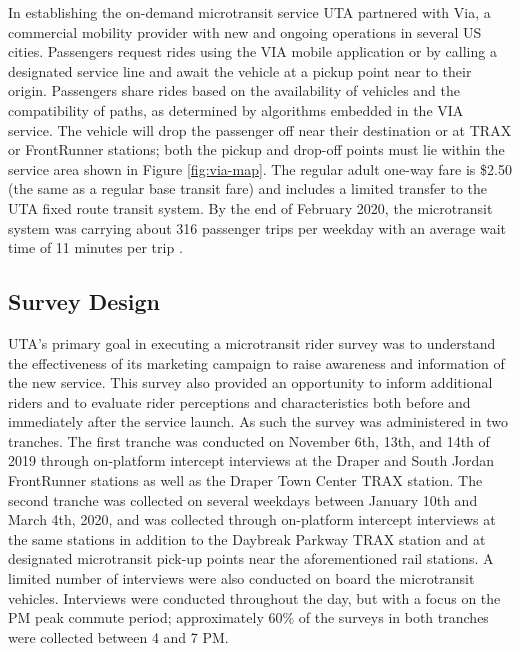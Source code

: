 \documentclass[smartcities,article,submit,moreauthors,pdftex]{mdpi}
\begin{document}
In establishing the on-demand microtransit service UTA partnered with Via, a
commercial mobility provider with new and ongoing operations in several US
cities. Passengers request rides using the VIA mobile application or by calling a
designated service line and await the vehicle at a pickup point near to their
origin. Passengers share rides based on the availability of vehicles and the
compatibility of paths, as determined by algorithms embedded in the VIA service.
The vehicle will drop the passenger off near their destination or at TRAX or
FrontRunner stations; both the pickup and drop-off points must lie within the
service area shown in Figure \ref{fig:via-map}. The regular adult one-way fare
is \$2.50 (the same as a regular base transit fare) and includes a limited
transfer to the UTA fixed route transit system. By the end of February 2020, the
microtransit system was carrying about 316 passenger trips per weekday with an
average wait time of 11 minutes per trip \citep{uta2020}.

\hypertarget{survey-design}{%
\subsection{Survey Design}\label{survey-design}}

UTA's primary goal in executing a microtransit rider survey was to understand the effectiveness
of its marketing campaign to raise awareness and information of the new service.
This survey also provided an opportunity to inform additional riders and to
evaluate rider perceptions and characteristics both before and immediately after
the service launch. As such the survey was administered in two tranches. The
first tranche was conducted on November 6th, 13th, and 14th of 2019 through
on-platform intercept interviews at the Draper and South Jordan FrontRunner
stations as well as the Draper Town Center TRAX station. The second tranche was
collected on several weekdays between January 10th and March 4th, 2020, and was
collected through on-platform intercept interviews at the same stations in
addition to the Daybreak Parkway TRAX station and at designated microtransit
pick-up points near the aforementioned rail stations. A limited number of
interviews were also conducted on board the microtransit vehicles. Interviews
were conducted throughout the day, but with a focus on the PM peak commute
period; approximately 60\% of the surveys in both tranches were collected between 4 and 7 PM.
\end{document}
